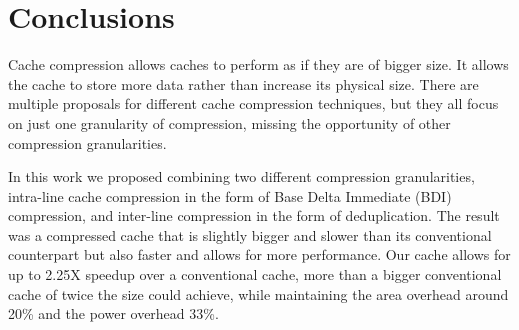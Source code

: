 
\chapter{Conclusions}
\label{ch:Conclusions}

Cache compression allows caches to perform as if they are of bigger size. It allows the cache to store more data rather than increase its physical size. There are multiple proposals for different cache compression techniques, but they all focus on just one granularity of compression, missing the opportunity of other compression granularities.\par
In this work we proposed combining two different compression granularities, intra-line cache compression in the form of Base Delta Immediate (BDI) compression, and inter-line compression in the form of deduplication. The result was a compressed cache that is slightly bigger and slower than its conventional counterpart but also faster and allows for more performance. Our cache allows for up to 2.25X speedup over a conventional cache, more than a bigger conventional cache of twice the size could achieve, while maintaining the area overhead around 20\% and the power overhead 33\%.\par